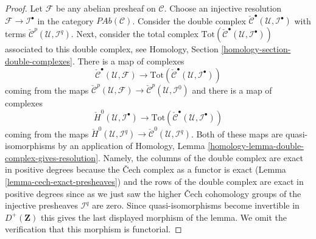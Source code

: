 \documentclass[10pt,a4paper]{amsart}
\theoremstyle{plain}
\theoremstyle{definition}
\theoremstyle{remark}
\numberwithin{equation}{subsection}
\begin{document}
\begin{proof}
\medskip\noindent
Let $\mathcal{F}$ be any abelian presheaf on $\mathcal{C}$.
Choose an injective resolution $\mathcal{F} \to \mathcal{I}^\bullet$
in the category $\textit{PAb}(\mathcal{C})$.
Consider the double complex
$\check{\mathcal{C}}^\bullet(\mathcal{U}, \mathcal{I}^\bullet)$
with terms $\check{\mathcal{C}}^p(\mathcal{U}, \mathcal{I}^q)$.
Next, consider the total complex
$\text{Tot}(\check{\mathcal{C}}^\bullet(\mathcal{U}, \mathcal{I}^\bullet))$
associated to this double complex, see
Homology, Section \ref{homology-section-double-complexes}.
There is a map of complexes
$$
\check{\mathcal{C}}^\bullet(\mathcal{U}, \mathcal{F})
\longrightarrow
\text{Tot}(\check{\mathcal{C}}^\bullet(\mathcal{U}, \mathcal{I}^\bullet))
$$
coming from the maps
$\check{\mathcal{C}}^p(\mathcal{U}, \mathcal{F})
\to \check{\mathcal{C}}^p(\mathcal{U}, \mathcal{I}^0)$
and there is a map of complexes
$$
\check{H}^0(\mathcal{U}, \mathcal{I}^\bullet)
\longrightarrow
\text{Tot}(\check{\mathcal{C}}^\bullet(\mathcal{U}, \mathcal{I}^\bullet))
$$
coming from the maps
$\check{H}^0(\mathcal{U}, \mathcal{I}^q) \to
\check{\mathcal{C}}^0(\mathcal{U}, \mathcal{I}^q)$.
Both of these maps are quasi-isomorphisms by an application of
Homology, Lemma \ref{homology-lemma-double-complex-gives-resolution}.
Namely, the columns of the double complex are exact in positive degrees
because the {\v C}ech complex as a functor is exact
(Lemma \ref{lemma-cech-exact-presheaves})
and the rows of the double complex are exact in positive degrees
since as we just saw the higher {\v C}ech cohomology groups of the injective
presheaves $\mathcal{I}^q$ are zero.
Since quasi-isomorphisms become invertible
in $D^{+}(\mathbf{Z})$ this gives the last displayed morphism
of the lemma. We omit the verification that this morphism is
functorial.
\end{proof}
\end{document}
